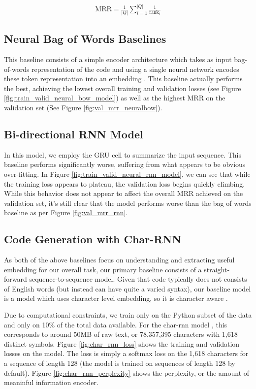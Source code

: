 \documentclass{article}
\begin{document}
\begin{align}
    \text{MRR} = \frac{1}{|Q|}\sum_{i=1}^{|Q|} \frac{1}{\text{rank}_i}
    \label{eq:mrr}
\end{align}

\subsection{Neural Bag of Words Baselines}
This baseline consists of a simple encoder architecture which takes as input bag-of-words representation of the code and using a single neural network encodes these token representation into an embedding \cite{codesearchnet}. This baseline actually performs the best, achieving the lowest overall training and validation losses (see Figure \ref{fig:train_valid_neural_bow_model}) as well as the highest MRR on the validation set (See Figure \ref{fig:val_mrr_neuralbow}).

\subsection{Bi-directional RNN Model}
In this model, we employ the GRU cell \cite{gru_cell} to summarize the input sequence. This baseline performs significantly worse, suffering from what appears to be obvious over-fitting. In Figure \ref{fig:train_valid_neural_rnn_model}, we can see that while the training loss appears to plateau, the validation loss begins quickly climbing. While this behavior does not appear to affect the overall MRR achieved on the validation set, it's still clear that the model performs worse than the bag of words baseline as per Figure \ref{fig:val_mrr_rnn}.

\subsection{Code Generation with Char-RNN}
As both of the above baselines focus on understanding and extracting useful embedding for our overall task, our primary baseline consists of a straight-forward sequence-to-sequence model. Given that code typically does not consists of English words (but instead can have quite a varied syntax), our baseline model is a model which uses character level embedding, so it is character aware \cite{charrnn}.

Due to computational constraints, we train only on the Python subset of the data and only on 10\% of the total data available. For the char-rnn model \cite{charrnn}, this corresponds to around 50MB of raw text, or 78,357,395 characters with 1,618 distinct symbols. Figure \ref{fig:char_rnn_loss} shows the training and validation losses on the model. The loss is simply a softmax loss on the 1,618 characters for a sequence of length 128 (the model is trained on sequences of length 128 by default). Figure \ref{fig:char_rnn_perplexity} shows the perplexity, or the amount of meaninful information encoder. 
\end{document}
